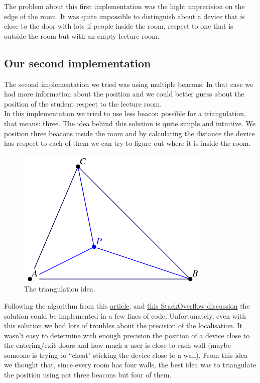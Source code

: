 The problem about this first implementation was the hight imprecision on the edge of the room. It was quite impossible to distinguish about a device that is close to the door with lots if people inside the room, respect to one that is outside the room but with an empty lecture room.\\

\subsection{Our second implementation}

The second implementation we tried was using multiple beacons. In that case we had more information about the position and we could better guess about the position of the student respect to the lecture room.\\

In this implementation we tried to use less beacon possible for a triangulation, that means: three. The idea behind this solution is quite simple and intuitive. We position three beacons inside the room and by calculating the distance the device has respect to each of them we can try to figure out where it is inside the room.\\

\begin{figure}[htbp]
\begin{center}
\includegraphics[scale=0.5]{img/triangulation.png}
\caption{The triangulation idea.}
\label{triangulation}
\end{center}
\end{figure}

Following the algorithm from this \href{http://everything2.com/title/Triangulate}{article}, and \href{http://stackoverflow.com/questions/20332856/triangulate-example-for-ibeacons}{this StackOverflow discussion} the solution could be implemented in a few lines of code. Unfortunately, even with this solution we had lots of troubles about the precision of the localisation. It wasn't easy to determine with enough precision the position of a device close to the entering/exit doors and how much a user is close to each wall (maybe someone is trying to ``cheat" sticking the device close to a wall).
From this idea we thought that, since every room has four walls, the best idea was to triangulate the position using not three beacons but four of them.\\

